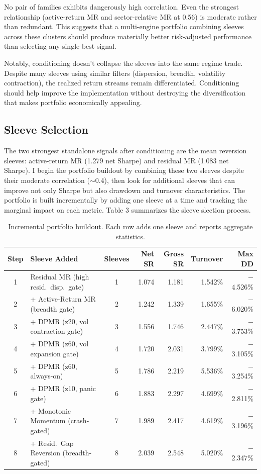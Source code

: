 \documentclass{article}
\begin{document}
No pair of families exhibits dangerously high correlation. Even the strongest relationship (active-return MR and sector-relative MR at 0.56) is moderate rather than redundant. This suggests that a multi-engine portfolio combining sleeves across these clusters should produce materially better risk-adjusted performance than selecting any single best signal.

Notably, conditioning doesn't collapse the sleeves into the same regime trade. Despite many sleeves using similar filters (dispersion, breadth, volatility contraction), the realized return streams remain differentiated. Conditioning should help improve the implementation without destroying the diversification that makes portfolio economically appealing.

\subsection{Sleeve Selection}

The two strongest standalone signals after conditioning are the mean reversion sleeves: active-return MR (1.279 net Sharpe) and residual MR (1.083 net Sharpe). I begin the portfolio buildout by combining these two sleeves despite their moderate correlation ($\sim$0.4), then look for additional sleeves that can improve not only Sharpe but also drawdown and turnover characteristics. The portfolio is built incrementally by adding one sleeve at a time and tracking the marginal impact on each metric. Table 3 summarizes the sleeve slection process.

\begin{table}[htbp]
    \centering
    \small
    \begin{tabular}{clcrrrr}
        \toprule
        Step & Sleeve Added & Sleeves & Net SR & Gross SR & Turnover & Max DD \\
        \midrule
        1 & Residual MR (high resid.\ disp.\ gate) & 1 & 1.074 & 1.181 & 1.542\% & $-$4.526\% \\
        2 & + Active-Return MR (breadth gate) & 2 & 1.242 & 1.339 & 1.655\% & $-$6.020\% \\
        3 & + DPMR (z20, vol contraction gate) & 3 & 1.556 & 1.746 & 2.447\% & $-$3.753\% \\
        4 & + DPMR (z60, vol expansion gate) & 4 & 1.720 & 2.031 & 3.799\% & $-$3.105\% \\
        5 & + DPMR (z60, always-on) & 5 & 1.786 & 2.219 & 5.536\% & $-$3.254\% \\
        6 & + DPMR (z10, panic gate) & 6 & 1.883 & 2.297 & 4.699\% & $-$2.811\% \\
        7 & + Monotonic Momentum (crash-gated) & 7 & 1.989 & 2.417 & 4.619\% & $-$3.196\% \\
        8 & + Resid.\ Gap Reversion (breadth-gated) & 8 & 2.039 & 2.548 & 5.020\% & $-$2.347\% \\
        \bottomrule
    \end{tabular}
    \caption{Incremental portfolio buildout. Each row adds one sleeve and reports aggregate statistics.}
    \label{tab:portfolio-buildout}
\end{table}
\end{document}
